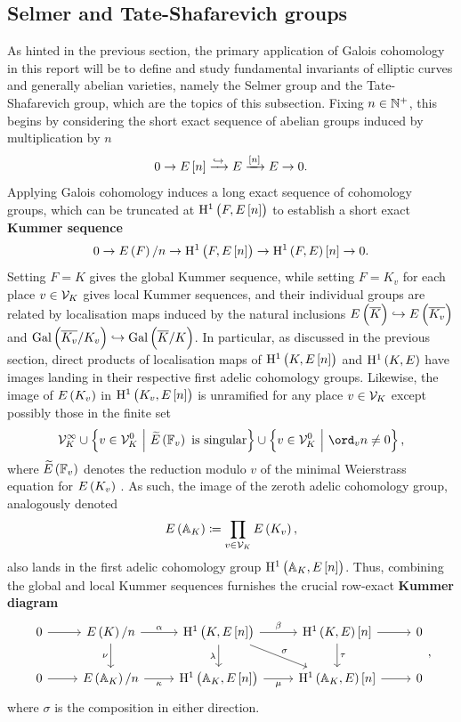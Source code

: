 \pagebreak

\subsection{Selmer and Tate-Shafarevich groups}

As hinted in the previous section, the primary application of Galois cohomology in this report will be to define and study fundamental invariants of elliptic curves and generally abelian varieties, namely the Selmer group and the Tate-Shafarevich group, which are the topics of this subsection. Fixing $ n \in \mathbb{N}^+ $, this begins by considering the short exact sequence of abelian groups induced by multiplication by $ n $
$$ 0 \to E\sbr{n} \xrightarrow{\hookrightarrow} E \xrightarrow{\sbr{n}} E \to 0. $$
Applying Galois cohomology induces a long exact sequence of cohomology groups, which can be truncated at $ \HE[n]{F} $ to establish a short exact \textbf{Kummer sequence} \cite[Sequence X.4$ \br{*} $]{Sil09}
$$ 0 \to \En{F} \to \HE[n]{F} \to \HE{F}\sbr{n} \to 0. $$
Setting $ F = K $ gives the global Kummer sequence, while setting $ F = K_v $ for each place $ v \in \mathcal{V}_K $ gives local Kummer sequences, and their individual groups are related by localisation maps induced by the natural inclusions $ E\br{\overline{K}} \hookrightarrow E\br{\overline{K_v}} $ and $ \AG{K_v} \hookrightarrow \AG{K} $. In particular, as discussed in the previous section, direct products of localisation maps of $ \HE[n]{K} $ and $ \HE{K} $ have images landing in their respective first adelic cohomology groups. Likewise, the image of $ E\br{K_v} $ in $ \HE[n]{K_v} $ is unramified for any place $ v \in \mathcal{V}_K $ except possibly those in the finite set
$$ \VVV_K^\infty \cup \cbr{v \in \VVV_K^0 \st \widetilde{E}\br{\FF_v} \ \text{is singular}} \cup \cbr{v \in \VVV_K^0 \st \ord_v n \ne 0}, $$
where $ \widetilde{E}\br{\FF_v} $ denotes the reduction modulo $ v $ of the minimal Weierstrass equation for $ E\br{K_v} $ \cite[Proposition VIII.2.1]{Sil09}. As such, the image of the zeroth adelic cohomology group, analogously denoted
$$ E\br{\AA_K} \coloneqq \PV E\br{K_v}, $$
also lands in the first adelic cohomology group $ \HE[n]{\AA_K} $. Thus, combining the global and local Kummer sequences furnishes the crucial row-exact \textbf{Kummer diagram} \cite[Diagram X.4$ \br{**} $]{Sil09}
$$
\begin{tikzcd}
0 \arrow{r} & \En{K} \arrow{r}{\alpha} \arrow{d}[swap]{\nu} & \HE[n]{K} \arrow{r}{\beta} \arrow{d}[swap]{\lambda} \arrow{dr}{\sigma} & \HE{K}\sbr{n} \arrow{r} \arrow{d}{\tau} & 0 \\
0 \arrow{r} & \En{\AA_K} \arrow{r}[swap]{\kappa} & \HE[n]{\AA_K} \arrow{r}[swap]{\mu} & \HE{\AA_K}\sbr{n} \arrow{r} & 0
\end{tikzcd},
$$
where $ \sigma $ is the composition in either direction.

